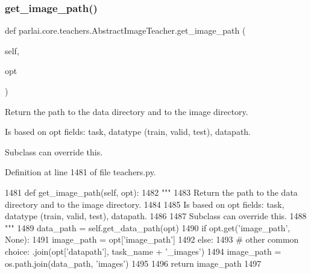 \subsubsection{\texorpdfstring{get\+\_\+image\+\_\+path()}{get\_image\_path()}}
{\footnotesize\ttfamily def parlai.\+core.\+teachers.\+Abstract\+Image\+Teacher.\+get\+\_\+image\+\_\+path (\begin{DoxyParamCaption}\item[{}]{self,  }\item[{}]{opt }\end{DoxyParamCaption})}

\begin{DoxyVerb}Return the path to the data directory and to the image directory.

Is based on opt fields: task, datatype (train, valid, test), datapath.

Subclass can override this.
\end{DoxyVerb}
 

Definition at line 1481 of file teachers.\+py.


\begin{DoxyCode}
1481     \textcolor{keyword}{def }get\_image\_path(self, opt):
1482         \textcolor{stringliteral}{"""}
1483 \textcolor{stringliteral}{        Return the path to the data directory and to the image directory.}
1484 \textcolor{stringliteral}{}
1485 \textcolor{stringliteral}{        Is based on opt fields: task, datatype (train, valid, test), datapath.}
1486 \textcolor{stringliteral}{}
1487 \textcolor{stringliteral}{        Subclass can override this.}
1488 \textcolor{stringliteral}{        """}
1489         data\_path = self.get\_data\_path(opt)
1490         \textcolor{keywordflow}{if} opt.get(\textcolor{stringliteral}{'image\_path'}, \textcolor{keywordtype}{None}):
1491             image\_path = opt[\textcolor{stringliteral}{'image\_path'}]
1492         \textcolor{keywordflow}{else}:
1493             \textcolor{comment}{# other common choice: .join(opt['datapath'], task\_name + '\_images')}
1494             image\_path = os.path.join(data\_path, \textcolor{stringliteral}{'images'})
1495 
1496         \textcolor{keywordflow}{return} image\_path
1497 
\end{DoxyCode}
\mbox{\label{classparlai_1_1core_1_1teachers_1_1AbstractImageTeacher_ada83f1832b7c75f9daab8e4d196ba893}} 
